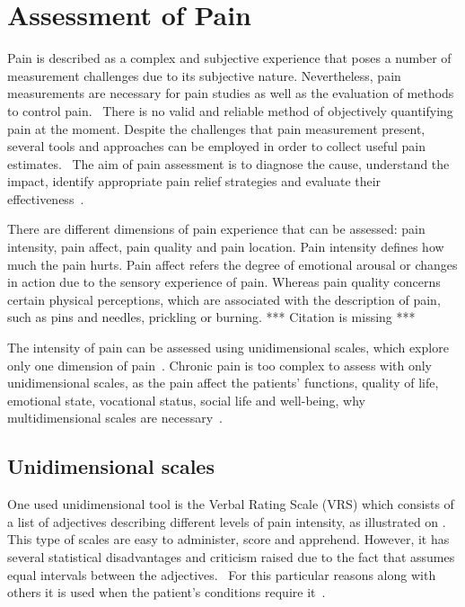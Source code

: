 \section{Assessment of Pain}
Pain is described as a complex and subjective experience that poses a number of measurement challenges due to its subjective nature. Nevertheless, pain measurements are necessary for pain studies as well as the evaluation of methods to control pain.~\cite{Jensen2001} There is no valid and reliable method of objectively quantifying pain at the moment. Despite the challenges that pain measurement present, several tools and approaches can be employed in order to collect useful pain estimates.~\cite{Younger2010} The aim of pain assessment is to diagnose the cause, understand the impact, identify appropriate pain relief strategies and evaluate their effectiveness~\cite{Briggs2010}.

There are different dimensions of pain experience that can be assessed: pain intensity, pain affect, pain quality and pain location. Pain intensity defines how much the pain hurts. %
Pain affect refers the degree of emotional arousal or changes in action due to the sensory experience of pain. Whereas pain quality concerns certain physical perceptions, which are associated with the description of pain, such as pins and needles, prickling or burning.   *** Citation is missing ***

The intensity of pain can be assessed using unidimensional scales, which explore only one dimension of pain~\cite{Jensen2001}. %
Chronic pain is too complex to assess with only unidimensional scales, as the pain affect the patients' functions, quality of life, emotional state, vocational status, social life and well-being, why multidimensional scales are necessary~\cite{Ebert2010}. 


\subsection{Unidimensional scales}
One used unidimensional tool is the Verbal Rating Scale (VRS) which consists of a list of adjectives describing different levels of pain intensity, as illustrated on . This type of scales are easy to administer, score and apprehend. However, it has several statistical disadvantages and criticism raised due to the fact that assumes equal intervals between the adjectives.~\cite{Jensen2001} For this particular reasons along with others it is used when the patient's conditions require it~\cite{Jensen1986}. 

